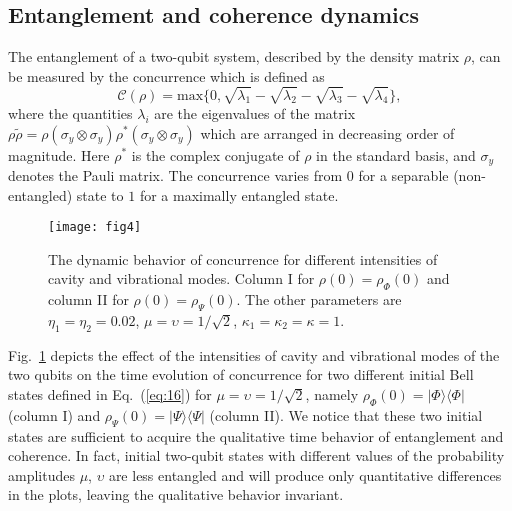 \documentclass[twocolumn,3p,times]{elsarticle}
\newcommand{\bra}[1]{\langle#1|}
\newcommand{\ket}[1]{|#1\rangle}
\begin{document}
\subsection{Entanglement and coherence dynamics}
The entanglement of a two-qubit system, described by the density matrix $\rho$, can be measured by the concurrence which is defined as \cite{PRL785022,PRL802245}
\begin{equation}
\label{eq:20}
\mathcal{C}(\rho)=\mathrm{max}\{0,\sqrt{\lambda_{1}}-\sqrt{\lambda_{2}}-\sqrt{\lambda_{3}}-\sqrt{\lambda_{4}}\},
\end{equation}                              
where the quantities $\lambda_{i}$ are the eigenvalues of the matrix $\rho\tilde{\rho}=\rho(\sigma_{y}\otimes\sigma_{y})\rho^{*}(\sigma_{y}\otimes\sigma_{y})$ which are arranged in decreasing order of magnitude. Here $\rho^{*}$ is the complex conjugate of $\rho$ in the standard basis, and $\sigma_{y}$ denotes the Pauli matrix. The concurrence varies from $0$ for a separable (non-entangled) state to $1$ for a maximally entangled state. 
\begin{figure}[t!]
\texttt{[image: fig4]}
\caption{The dynamic behavior of concurrence for different intensities of cavity and vibrational modes. Column I for  
$\rho(0)=\rho_{\Phi}(0)$ and column II for $\rho(0)=\rho_{\Psi}(0)$. The other parameters are $\eta_{1}=\eta_{2}=0.02$, $\mu=\upsilon=1/\sqrt{2}$, $\kappa_{1}=\kappa_{2}=\kappa=1$.}
\label{opt4}
\end{figure}
Fig.~\ref{opt4} depicts the effect of the intensities of cavity and vibrational modes of the two qubits on the time evolution of concurrence for two different initial Bell states defined in Eq.~(\ref{eq:16}) for $\mu=\upsilon=1/\sqrt{2}$, namely $\rho_{\Phi}(0)=\ket{\Phi}\bra{\Phi}$ (column I) and $\rho_{\Psi}(0)=\ket{\Psi}\bra{\Psi}$ (column II). We notice that these two initial states are sufficient to acquire the qualitative time behavior of entanglement and coherence. In fact, initial two-qubit states with different values of the probability amplitudes $\mu$, $\upsilon$ are less entangled and will produce only quantitative differences in the plots, leaving the qualitative behavior invariant. 
\end{document}
